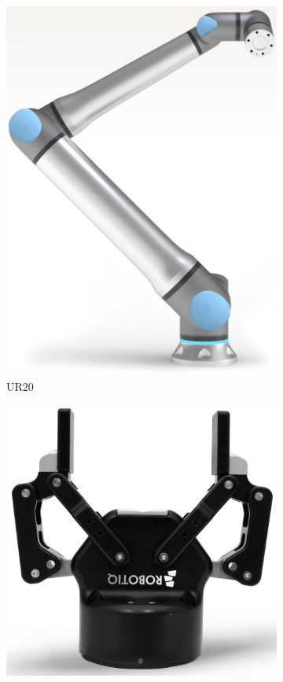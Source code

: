 \documentclass[journal]{new-aiaa}
\begin{document}
\begin{figure}[H]
    \centering
    \begin{subfigure}{0.45\textwidth}
        \centering
        \includegraphics[width=\textwidth]{UR.PNG}
        \caption{UR20 \cite{UR20}}
        \label{fig:UR20}
    \end{subfigure}
    \hfill
    \begin{subfigure}{0.45\textwidth}
        \centering
        \includegraphics[width=\textwidth]{Robotiq_85.PNG}

\end{subfigure}
\end{figure}
\end{document}
